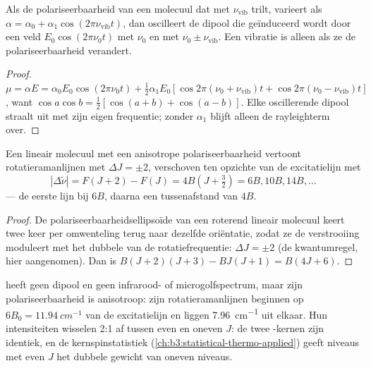 \begin{proposition}\label{prop:b3:rovibrational-spectroscopy:raman-classical}
Als de polariseerbaarheid van een molecuul dat met $\nu_{\mathrm{vib}}$ trilt,
varieert als $\alpha = \alpha_0 + \alpha_1\cos(2\pi\nu_{\mathrm{vib}}t)$, dan
oscilleert de dipool die geïnduceerd wordt door een
veld $E_0\cos(2\pi\nu_0t)$ met $\nu_0$ en met $\nu_0 \pm \nu_{\mathrm{vib}}$.
Een vibratie is alleen  als ze de polariseerbaarheid verandert.
\end{proposition}

\begin{proof}
$\mu = \alpha E = \alpha_0E_0\cos(2\pi\nu_0t) + \frac12\alpha_1E_0[\cos2\pi(\nu_0 +
\nu_{\mathrm{vib}})t + \cos2\pi(\nu_0 - \nu_{\mathrm{vib}})t]$, want $\cos a\cos b =
\frac12[\cos(a+b) + \cos(a-b)]$. Elke oscillerende dipool straalt uit met
zijn eigen frequentie; zonder $\alpha_1$ blijft alleen de rayleighterm over.
\end{proof}

\begin{proposition}[Rotatieramanlijnen]\label{prop:b3:rovibrational-spectroscopy:rotational-raman}
Een lineair molecuul met een anisotrope polariseerbaarheid vertoont
rotatieramanlijnen met $\Delta J = \pm2$, verschoven ten opzichte van de
excitatielijn met
\[
|\Delta\tilde\nu| = F(J+2) - F(J) = 4B(J + \tfrac32) = 6B, 10B, 14B, \dots
\]
--- de eerste lijn bij $6B$, daarna een tussenafstand van $4B$.
\end{proposition}

\begin{proof}
De polariseerbaarheidsellipsoïde van een roterend lineair molecuul keert
twee keer per omwenteling terug naar dezelfde oriëntatie, zodat ze de
verstrooiing moduleert met het dubbele van de rotatiefrequentie: $\Delta J = \pm2$ (de
kwantumregel, hier aangenomen). Dan is
$B(J+2)(J+3) - BJ(J+1) = B(4J + 6)$.
\end{proof}

\begin{example}\label{ex:b3:rovibrational-spectroscopy:n2}
 heeft geen dipool en geen infrarood- of microgolfspectrum, maar
zijn polariseerbaarheid is anisotroop: zijn rotatieramanlijnen beginnen
op $6B_0 =
\qty{11.94}{cm^{-1}}$ van de excitatielijn en liggen \qty{7.96}{cm^{-1}}
uit elkaar. Hun intensiteiten wisselen 2:1 af tussen even en oneven $J$:
de twee -kernen zijn identiek, en de kernspinstatistiek
(\cref{ch:b3:statistical-thermo-applied}) geeft niveaus met even $J$ het
dubbele gewicht van oneven niveaus.
\end{example}

